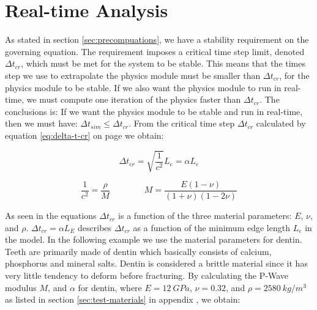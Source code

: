 \section{Real-time Analysis}
\label{sec:realtime_analysis}
As stated in section \vref{sec:precompuations}, we have a stability
requirement on the governing equation. The requirement imposes a
critical time step limit, denoted $\Delta t_{cr}$, which must
be met for the system to be stable.
%
This means that the times step we use to extrapolate the physics
module must be smaller than $\Delta t_{cr}$, for the physics module to
be stable.
%
If we also want the physics module to run in real-time, we
must compute one iteration of the  physics faster than
$\Delta t_{cr}$.
%
The conclusions is: If we want the physics module to be
stable and run in real-time, then we must have:
$\Delta t_{sim} \le  \Delta t_{cr}$.
%
%
From the critical time step $\Delta t_{cr}$ calculated by equation
\eqref{eq:delta-t-cr} on page \pageref{eq:delta-t-cr} we
obtain:


\begin{equation*}
\Delta t_{cr} = \sqrt{\frac{1}{c^2}} L_e = \alpha L_e
\end{equation*}

\begin{equation*}
\frac{1}{c^2} = \frac{\rho}{M}
\qquad \qquad
M = \frac{E(1-\nu)}{(1+\nu)(1-2\nu)}
\end{equation*}

As seen in the equations $\Delta t_{cr}$ is a function of the three
material parameters: $E$, $\nu$, and $\rho$.
%
$\Delta t_{cr} = \alpha L_E$ describes $\Delta t_{cr}$ as a function
of the minimum edge length $L_e$ in the
model.
%
%
In the following example we use the material parameters for dentin.
Teeth are primarily made of dentin which basically consists of
calcium, phosphorus and mineral salts. Dentin is considered a
brittle material since it has very little tendency to deform before
fracturing.
%
%
%
%
By calculating the P-Wave modulus $M$, and $\alpha$ for dentin, where
$E=12 \ GPa$, $\nu=0.32$, and $\rho=2580 \ kg/m^3$ as listed in section
\vref{sec:test-materials} in appendix , we obtain:

